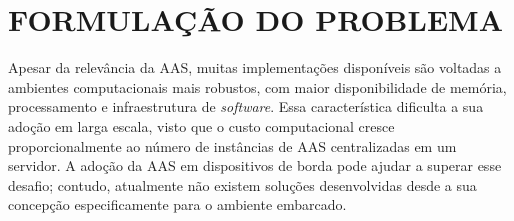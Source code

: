 \chapter{FORMULAÇÃO DO PROBLEMA}

Apesar da relevância da AAS, muitas implementações disponíveis são voltadas a ambientes computacionais mais robustos, com maior disponibilidade de memória, processamento e infraestrutura de \textit{software}. Essa característica dificulta a sua adoção em larga escala, visto que o custo computacional cresce proporcionalmente ao número de instâncias de AAS centralizadas em um servidor. A adoção da AAS em dispositivos de borda pode ajudar a superar esse desafio; contudo, atualmente não existem soluções desenvolvidas desde a sua concepção especificamente para o ambiente embarcado.
